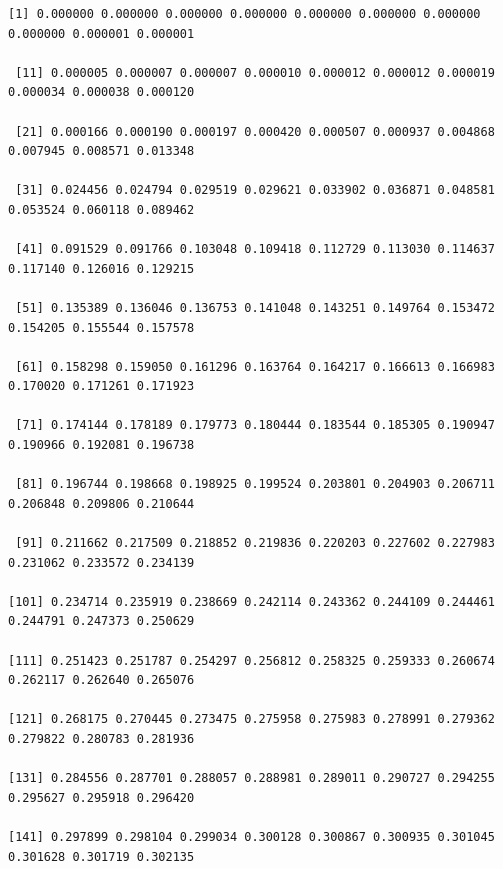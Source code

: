 \documentclass[12pt]{article}
\begin{document}
\begin{adjustwidth}{-1cm}{0cm}
\begin{Verbatim}[fontsize=\footnotesize]
  [1] 0.000000 0.000000 0.000000 0.000000 0.000000 0.000000 0.000000 0.000000 0.000001 0.000001

 [11] 0.000005 0.000007 0.000007 0.000010 0.000012 0.000012 0.000019 0.000034 0.000038 0.000120

 [21] 0.000166 0.000190 0.000197 0.000420 0.000507 0.000937 0.004868 0.007945 0.008571 0.013348
 
 [31] 0.024456 0.024794 0.029519 0.029621 0.033902 0.036871 0.048581 0.053524 0.060118 0.089462
 
 [41] 0.091529 0.091766 0.103048 0.109418 0.112729 0.113030 0.114637 0.117140 0.126016 0.129215
 
 [51] 0.135389 0.136046 0.136753 0.141048 0.143251 0.149764 0.153472 0.154205 0.155544 0.157578
 
 [61] 0.158298 0.159050 0.161296 0.163764 0.164217 0.166613 0.166983 0.170020 0.171261 0.171923
 
 [71] 0.174144 0.178189 0.179773 0.180444 0.183544 0.185305 0.190947 0.190966 0.192081 0.196738
 
 [81] 0.196744 0.198668 0.198925 0.199524 0.203801 0.204903 0.206711 0.206848 0.209806 0.210644
 
 [91] 0.211662 0.217509 0.218852 0.219836 0.220203 0.227602 0.227983 0.231062 0.233572 0.234139
 
[101] 0.234714 0.235919 0.238669 0.242114 0.243362 0.244109 0.244461 0.244791 0.247373 0.250629

[111] 0.251423 0.251787 0.254297 0.256812 0.258325 0.259333 0.260674 0.262117 0.262640 0.265076

[121] 0.268175 0.270445 0.273475 0.275958 0.275983 0.278991 0.279362 0.279822 0.280783 0.281936

[131] 0.284556 0.287701 0.288057 0.288981 0.289011 0.290727 0.294255 0.295627 0.295918 0.296420

[141] 0.297899 0.298104 0.299034 0.300128 0.300867 0.300935 0.301045 0.301628 0.301719 0.302135   
\end{Verbatim}
\end{adjustwidth}
\end{document}
